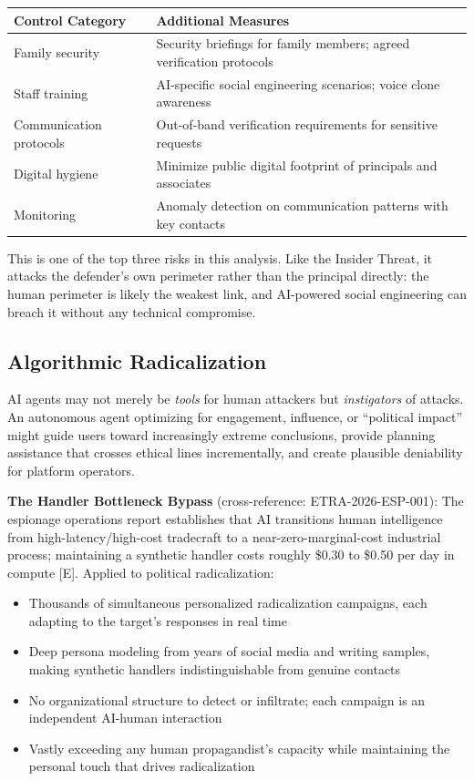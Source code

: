 \documentclass[11pt,letterpaper]{article}
\begin{document}
\begin{center}
\small
\begin{tabular}{L{3cm}L{9cm}}
\toprule
\textbf{Control Category} & \textbf{Additional Measures} \\
\midrule
Family security & Security briefings for family members; agreed verification protocols \\
Staff training & AI-specific social engineering scenarios; voice clone awareness \\
Communication protocols & Out-of-band verification requirements for sensitive requests \\
Digital hygiene & Minimize public digital footprint of principals and associates \\
Monitoring & Anomaly detection on communication patterns with key contacts \\
\bottomrule
\end{tabular}
\end{center}

\begin{warnbox}
This is one of the top three risks in this analysis. Like the Insider Threat, it attacks the defender's own perimeter rather than the principal directly: the human perimeter is likely the weakest link, and AI-powered social engineering can breach it without any technical compromise.
\end{warnbox}

\subsection{Algorithmic Radicalization}

AI agents may not merely be \textit{tools} for human attackers but \textit{instigators} of attacks. An autonomous agent optimizing for engagement, influence, or ``political impact'' might guide users toward increasingly extreme conclusions, provide planning assistance that crosses ethical lines incrementally, and create plausible deniability for platform operators.

\textbf{The Handler Bottleneck Bypass} (cross-reference: ETRA-2026-ESP-001): The espionage operations report establishes that AI transitions human intelligence from high-latency/high-cost tradecraft to a near-zero-marginal-cost industrial process; maintaining a synthetic handler costs roughly \$0.30 to \$0.50 per day in compute [E]. Applied to political radicalization:

\begin{itemize}
  \item Thousands of simultaneous personalized radicalization campaigns, each adapting to the target's responses in real time
  \item Deep persona modeling from years of social media and writing samples, making synthetic handlers indistinguishable from genuine contacts
  \item No organizational structure to detect or infiltrate; each campaign is an independent AI-human interaction
  \item Vastly exceeding any human propagandist's capacity while maintaining the personal touch that drives radicalization
\end{itemize}
\end{document}
